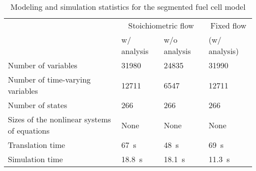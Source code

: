 \begin{table}[ht!]
  \caption{Modeling and simulation statistics for the segmented fuel cell model}
  \label{tab:SegmentedStatistics}
  \begin{singlespaced}%
    \begin{tabular}{llll}%
      \toprule 
      & \multicolumn{2}{c}{Stoichiometric flow} & \multicolumn{1}{c}{Fixed flow} \\
      \cmidrule{2-3}
      & w/ analysis & w/o analysis &  (w/ analysis) \\
      \midrule
      Number of variables & \num{31980} & \num{24835} & \num{31990} \\
      Number of time-varying variables & \num{12711} & \num{6547} & \num{12711} \\
      Number of states & 266 & 266 & 266 \\
      Sizes of the nonlinear systems of equations & None & None & None \\
      Translation time & \SI{67}{s} & \SI{48}{s} & \SI{69}{s} \\
      Simulation time & \SI{18.8}{s} & \SI{18.1}{s} & \SI{11.3}{s} \\
      \bottomrule
    \end{tabular}
  \end{singlespaced}
\end{table}
